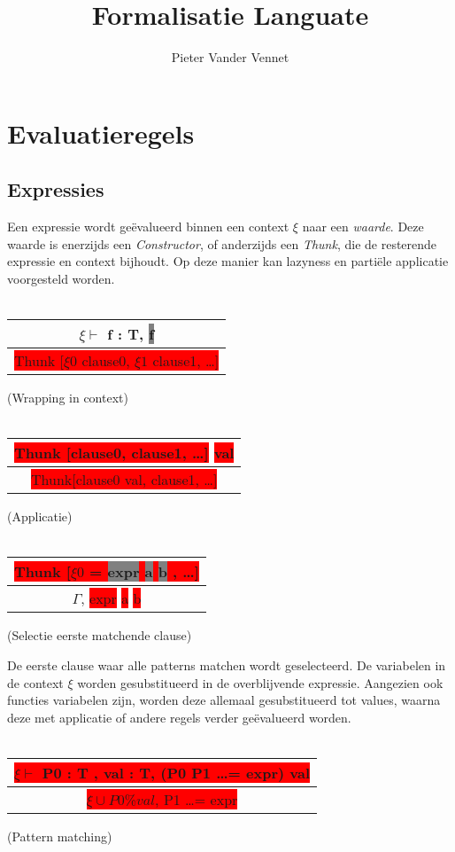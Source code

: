\documentclass{article}
\begin{document}
\newcommand{\infrule}[2]{~\\ \begin{tabular}{c}#1\\ \hline#2 \end{tabular}}
\newcommand{\infruleC}[3]{\infrule{#1}{#2} (#3)}
\newcommand{\code}[1]{\textbf{#1}}
\newcommand{\syntax}[1]{\colorbox{grey}{#1} }
\newcommand{\val}[1]{\colorbox{red}{#1} }
\newcommand{\arr}{$\rightarrow$}
\newcommand{\amp}{\&}
\newcommand{\n}{$\backslash$n }
\newcommand{\perc}{$\%$}
\title{Formalisatie Languate}
\author{Pieter Vander Vennet}
\maketitle


\clearpage

\clearpage

\section{Evaluatieregels}

\subsection{Expressies}

Een expressie wordt ge\"evalueerd binnen een context $\xi$ naar een \emph{waarde}. Deze waarde is enerzijds een \emph{Constructor},
of anderzijds een \emph{Thunk}, die de resterende expressie en context bijhoudt.
Op deze manier kan lazyness en parti\"ele applicatie voorgesteld worden.
~\\

\infruleC{$\xi \vdash$ f : T, \syntax{f}}{\val{Thunk [$\xi0$ clause0, $\xi1$ clause1, \ldots]}}{Wrapping in context}
~\\

\infruleC{\val{Thunk [clause0, clause1, \ldots]} \val{val}}{\val{Thunk[clause0 val, clause1, \ldots]}}{Applicatie}
~\\

\infruleC{\val{Thunk [$\xi0$ \code{= \syntax{expr} \syntax{a} \syntax{b}}, \ldots]}} {$\Gamma$, \val{expr} \val{a} \val{b}}
{Selectie eerste matchende clause}

De eerste clause waar alle patterns matchen wordt geselecteerd. 
De variabelen in de context $\xi$ worden gesubstitueerd in de overblijvende expressie. 
Aangezien ook functies variabelen zijn, worden deze allemaal gesubstitueerd tot values, waarna deze met applicatie of andere regels verder ge\"evalueerd worden.
~\\
\infruleC{\val{$\xi \vdash$ P0 : T , val : T, (P0 P1 \ldots = expr) val}}
{\val{$\xi \cup P0 \perc val$, P1 \ldots = expr}}
{Pattern matching}
\end{document}
